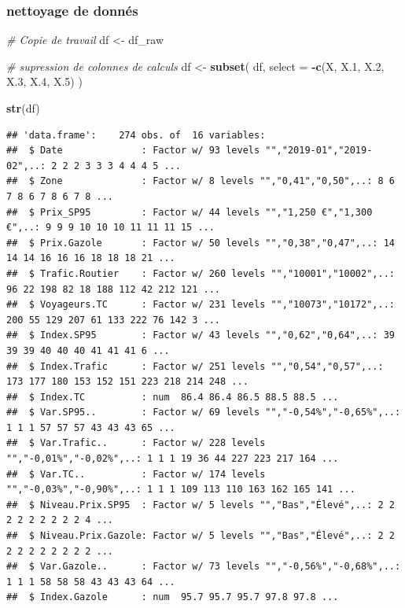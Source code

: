 \documentclass[
]{article}
\newenvironment{Shaded}{\begin{snugshade}}{\end{snugshade}}
\newcommand{\AttributeTok}[1]{\textcolor[rgb]{0.13,0.29,0.53}{#1}}
\newcommand{\CommentTok}[1]{\textcolor[rgb]{0.56,0.35,0.01}{\textit{#1}}}
\newcommand{\FloatTok}[1]{\textcolor[rgb]{0.00,0.00,0.81}{#1}}
\newcommand{\FunctionTok}[1]{\textcolor[rgb]{0.13,0.29,0.53}{\textbf{#1}}}
\newcommand{\NormalTok}[1]{#1}
\newcommand{\OtherTok}[1]{\textcolor[rgb]{0.56,0.35,0.01}{#1}}
\newcommand{\SpecialCharTok}[1]{\textcolor[rgb]{0.81,0.36,0.00}{\textbf{#1}}}
\begin{document}
\subsubsection{nettoyage de donnés}\label{nettoyage-de-donnuxe9s}

\begin{Shaded}
\begin{Highlighting}[]
\CommentTok{\# Copie de travail}
\NormalTok{df }\OtherTok{\textless{}{-}}\NormalTok{ df\_raw}
\end{Highlighting}
\end{Shaded}

\begin{Shaded}
\begin{Highlighting}[]
\CommentTok{\# supression de colonnes de calculs}
\NormalTok{df }\OtherTok{\textless{}{-}} \FunctionTok{subset}\NormalTok{(}
\NormalTok{  df,}
  \AttributeTok{select =} \SpecialCharTok{{-}}\FunctionTok{c}\NormalTok{(X, X}\FloatTok{.1}\NormalTok{, X}\FloatTok{.2}\NormalTok{, X}\FloatTok{.3}\NormalTok{, X}\FloatTok{.4}\NormalTok{, X}\FloatTok{.5}\NormalTok{)}
\NormalTok{)}
\end{Highlighting}
\end{Shaded}

\begin{Shaded}
\begin{Highlighting}[]
\FunctionTok{str}\NormalTok{(df)}
\end{Highlighting}
\end{Shaded}

\begin{verbatim}
## 'data.frame':    274 obs. of  16 variables:
##  $ Date              : Factor w/ 93 levels "","2019-01","2019-02",..: 2 2 2 3 3 3 4 4 4 5 ...
##  $ Zone              : Factor w/ 8 levels "","0,41","0,50",..: 8 6 7 8 6 7 8 6 7 8 ...
##  $ Prix_SP95         : Factor w/ 44 levels "","1,250 €","1,300 €",..: 9 9 9 10 10 10 11 11 11 15 ...
##  $ Prix.Gazole       : Factor w/ 50 levels "","0,38","0,47",..: 14 14 14 16 16 16 18 18 18 21 ...
##  $ Trafic.Routier    : Factor w/ 260 levels "","10001","10002",..: 96 22 198 82 18 188 112 42 212 121 ...
##  $ Voyageurs.TC      : Factor w/ 231 levels "","10073","10172",..: 200 55 129 207 61 133 222 76 142 3 ...
##  $ Index.SP95        : Factor w/ 43 levels "","0,62","0,64",..: 39 39 39 40 40 40 41 41 41 6 ...
##  $ Index.Trafic      : Factor w/ 251 levels "","0,54","0,57",..: 173 177 180 153 152 151 223 218 214 248 ...
##  $ Index.TC          : num  86.4 86.4 86.5 88.5 88.5 ...
##  $ Var.SP95..        : Factor w/ 69 levels "","-0,54%","-0,65%",..: 1 1 1 57 57 57 43 43 43 65 ...
##  $ Var.Trafic..      : Factor w/ 228 levels "","-0,01%","-0,02%",..: 1 1 1 19 36 44 227 223 217 164 ...
##  $ Var.TC..          : Factor w/ 174 levels "","-0,03%","-0,90%",..: 1 1 1 109 113 110 163 162 165 141 ...
##  $ Niveau.Prix.SP95  : Factor w/ 5 levels "","Bas","Élevé",..: 2 2 2 2 2 2 2 2 2 4 ...
##  $ Niveau.Prix.Gazole: Factor w/ 5 levels "","Bas","Élevé",..: 2 2 2 2 2 2 2 2 2 2 ...
##  $ Var.Gazole..      : Factor w/ 73 levels "","-0,56%","-0,68%",..: 1 1 1 58 58 58 43 43 43 64 ...
##  $ Index.Gazole      : num  95.7 95.7 95.7 97.8 97.8 ...
\end{verbatim}
\end{document}
